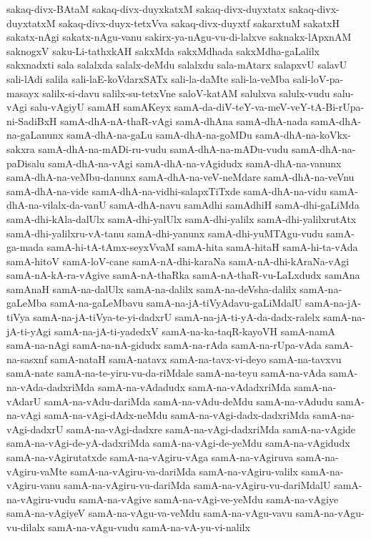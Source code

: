 {sakaq-divx-BAtaM
sakaq-divx-duyxkatxM
sakaq-divx-duyxtatx
sakaq-divx-duyxtatxM
sakaq-divx-duyx-tetxVva
sakaq-divx-duyxtf
sakarxtuM
sakatxH
sakatx-nAgi
sakatx-nAgu-vanu
sakirx-ya-nAgu-vu-di-lalxve
saknakx-lApxnAM
saknogxV
saku-Li-tathxkAH
sakxMda
sakxMdhada
sakxMdha-gaLalilx
sakxnadxti
sala
salalxda
salalx-deMdu
salalxdu
sala-mAtarx
salapxvU
salavU
sali-lAdi
salila
sali-laE-koVdarxSATx
sali-la-daMte
sali-la-veMba
sali-loV-pa-masayx
salilx-si-davu
salilx-su-tetxVne
saloV-katAM
salulxva
salulx-vudu
salu-vAgi
salu-vAgiyU
samAH
samAKeyx
samA-da-diV-teY-va-meV-veY-tA-Bi-rUpa-ni-SadiBxH
samA-dhA-nA-thaR-vAgi
samA-dhAna
samA-dhA-nada
samA-dhA-na-gaLanunx
samA-dhA-na-gaLu
samA-dhA-na-goMDu
samA-dhA-na-koVkx-sakxra
samA-dhA-na-mADi-ru-vudu
samA-dhA-na-mADu-vudu
samA-dhA-na-paDisalu
samA-dhA-na-vAgi
samA-dhA-na-vAgidudx
samA-dhA-na-vanunx
samA-dhA-na-veMbu-danunx
samA-dhA-na-veV-neMdare
samA-dhA-na-veVnu
samA-dhA-na-vide
samA-dhA-na-vidhi-salapxTiTxde
samA-dhA-na-vidu
samA-dhA-na-vilalx-da-vanU
samA-dhA-navu
samAdhi
samAdhiH
samA-dhi-gaLiMda
samA-dhi-kAla-dalUlx
samA-dhi-yalUlx
samA-dhi-yalilx
samA-dhi-yalilxrutAtx
samA-dhi-yalilxru-vA-tanu
samA-dhi-yanunx
samA-dhi-yuMTAgu-vudu
samA-ga-mada
samA-hi-tA-tAmx-seyxVvaM
samA-hita
samA-hitaH
samA-hi-ta-vAda
samA-hitoV
samA-loV-cane
samA-nA-dhi-karaNa
samA-nA-dhi-kAraNa-vAgi
samA-nA-kA-ra-vAgive
samA-nA-thaRka
samA-nA-thaR-vu-LaLxdudx
samAna
samAnaH
samA-na-dalUlx
samA-na-dalilx
samA-na-deVsha-dalilx
samA-na-gaLeMba
samA-na-gaLeMbavu
samA-na-jA-tiVyAdavu-gaLiMdalU
samA-na-jA-tiVya
samA-na-jA-tiVya-te-yi-dadxrU
samA-na-jA-ti-yA-da-dadx-ralelx
samA-na-jA-ti-yAgi
samA-na-jA-ti-yadedxV
samA-na-ka-taqR-kayoVH
samA-namA
samA-na-nAgi
samA-na-nA-gidudx
samA-na-rAda
samA-na-rUpa-vAda
samA-na-sasxnf
samA-nataH
samA-natavx
samA-na-tavx-vi-deyo
samA-na-tavxvu
samA-nate
samA-na-te-yiru-vu-da-riMdale
samA-na-teyu
samA-na-vAda
samA-na-vAda-dadxriMda
samA-na-vAdadudx
samA-na-vAdadxriMda
samA-na-vAdarU
samA-na-vAdu-dariMda
samA-na-vAdu-deMdu
samA-na-vAdudu
samA-na-vAgi
samA-na-vAgi-dAdx-neMdu
samA-na-vAgi-dadx-dadxriMda
samA-na-vAgi-dadxrU
samA-na-vAgi-dadxre
samA-na-vAgi-dadxriMda
samA-na-vAgide
samA-na-vAgi-de-yA-dadxriMda
samA-na-vAgi-de-yeMdu
samA-na-vAgidudx
samA-na-vAgirutatxde
samA-na-vAgiru-vAga
samA-na-vAgiruva
samA-na-vAgiru-vaMte
samA-na-vAgiru-va-dariMda
samA-na-vAgiru-valilx
samA-na-vAgiru-vanu
samA-na-vAgiru-vu-dariMda
samA-na-vAgiru-vu-dariMdalU
samA-na-vAgiru-vudu
samA-na-vAgive
samA-na-vAgi-ve-yeMdu
samA-na-vAgiye
samA-na-vAgiyeV
samA-na-vAgu-va-veMdu
samA-na-vAgu-vavu
samA-na-vAgu-vu-dilalx
samA-na-vAgu-vudu
samA-na-vA-yu-vi-nalilx
}
